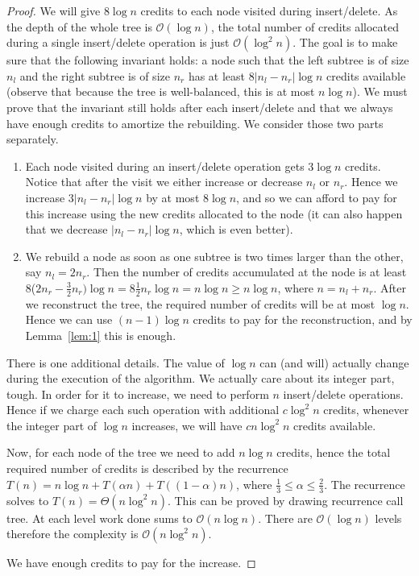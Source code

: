 \documentclass[10pt,a4paper]{article}
\newcommand{\Oh}{\mathcal{O}}
\begin{document}
\begin{proof}

We will give $8\log n$ credits to each node visited during insert/delete. As the depth of the whole tree is $\Oh(\log n)$, the total number of credits allocated during a single insert/delete operation is just $\Oh(\log^{2}n)$. The goal is to make sure that the following invariant holds: a node such that the left subtree is of size $n_{l}$ and the right subtree is of size $n_{r}$ has at least $8|n_{l}-n_{r}|\log n$ credits available (observe that because the tree is well-balanced, this is at most $n\log n$). We must prove that the invariant still holds after each insert/delete and that we always have enough credits to amortize the rebuilding. We consider those two parts separately.

\begin{enumerate}

\item Each node visited during an insert/delete operation gets $3\log n$ credits. Notice that after the visit we either increase or decrease $n_{l}$ or $n_{r}$. Hence we increase $3|n_{l}-n_{r}|\log n$ by at most $8\log n$, and so we can afford to pay for this increase using the new credits allocated to the node (it can also happen that we decrease $|n_{l}-n_{r}|\log n$, which is even better).

\item We rebuild a node as soon as one subtree is two times larger than the other, say $n_{l} = 2n_{r}$. Then the number of credits accumulated at the node is at least 8($2n_{r}-\frac{3}{2}n_{r}
)\log n = 8\frac{1}{2}n_{r}\log n = n\log n \geq n\log n$, where $n=n_{l}+n_{r}$. After we reconstruct the tree, the required number of credits will be at most $\log n$. Hence we can use $(n-1)\log n$ credits to pay for the reconstruction, and by Lemma~\ref{lem:1} this is enough.

\end{enumerate}

There is one additional details. The value of $\log n$ can (and will) actually change during the execution of the algorithm. We actually care about its integer part, tough. In order for it to increase, we need to perform $n$ insert/delete operations. Hence if we charge each such operation with additional $c\log^{2} n$ credits, whenever the integer part of $\log n$ increases, we will have $cn\log^{2} n$ credits available. 

Now, for each node of the tree we need to add $n\log n$ credits, hence the total required number of credits is described by the recurrence $T(n)=n\log n+T(\alpha n)+T((1-\alpha)n)$, where $\frac{1}{3}\leq \alpha \leq \frac{2}{3}$. The recurrence solves to $T(n)=\Theta(n\log^{2}n)$. This can be proved by drawing recurrence call tree. At each level work done sums to $\Oh(n \log n)$. There are $\Oh(\log n)$ levels therefore the complexity is $\Oh(n \log^2 n)$.

We have enough credits to pay for the increase.
\end{proof}
\end{document}
